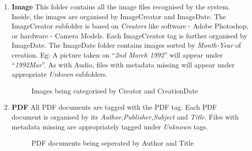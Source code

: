 \begin{enumerate}
\item \textbf{Image} \newline
This folder contains all the image files recognised by the system. Inside, the images are organised by ImageCreator and ImageDate. 
The ImageCreator subfolder is based on \textit{Creators} like software - Adobe Photoshop, or hardware - Camera Models. Each ImageCreator tag is further organised by ImageDate. 
The ImageDate folder contains images sorted by \textit{Month-Year} of creation. Eg: A picture taken on ``\textit{2nd March 1992}'' will appear under ``\textit{1992Mar}''.
As with Audio, files with metadata missing will appear under appropriate \textit{Unkown} subfolders.
\begin{figure}[htb]
\centering
\setlength\fboxsep{0pt}
\setlength\fboxrule{0.5pt}
\caption{Images being categorised by Creator and CreationDate}
\label{fig:dfd0}
\end{figure}

\item \textbf{PDF} \newline
All PDF documents are tagged with the PDF tag. Each PDF document is organised by its \textit{Author,Publisher,Subject} and \textit{Title}. Files with metadata missing are appropriately tagged under \textit{Unknown} tags.
\begin{figure}[htb]
\centering
\setlength\fboxsep{0pt}
\setlength\fboxrule{0.5pt}
\caption{PDF documents being seperated by Author and Title}
\label{fig:dfd0}
\end{figure}


\end{enumerate}
